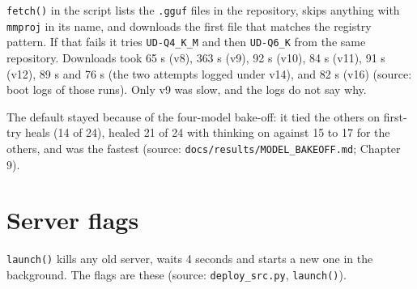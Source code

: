 \texttt{fetch()} in the script lists the \texttt{.\allowbreak{}gguf} files in the repository, skips anything with \texttt{mmproj} in its name, and downloads the first file that matches the registry pattern. If that fails it tries \texttt{UD-\allowbreak{}Q4\_\allowbreak{}K\_\allowbreak{}M} and then \texttt{UD-\allowbreak{}Q6\_\allowbreak{}K} from the same repository. Downloads took 65 s (v8), 363 s (v9), 92 s (v10), 84 s (v11), 91 s (v12), 89 s and 76 s (the two attempts logged under v14), and 82 s (v16) (source: boot logs of those runs). Only v9 was slow, and the logs do not say why.

The default stayed because of the four-model bake-off: it tied the others on first-try heals (14 of 24), healed 21 of 24 with thinking on against 15 to 17 for the others, and was the fastest (source: \texttt{docs/\allowbreak{}results/\allowbreak{}MODEL\_\allowbreak{}BAKEOFF.\allowbreak{}md}; Chapter 9).

\section{Server flags}

\texttt{launch()} kills any old server, waits 4 seconds and starts a new one in the background. The flags are these (source: \texttt{deploy\_\allowbreak{}src.\allowbreak{}py}, \texttt{launch()}).

